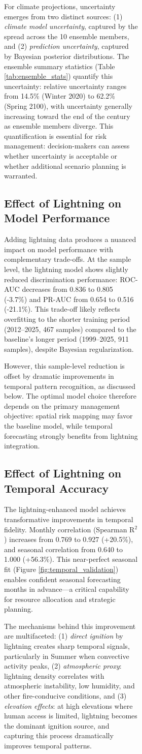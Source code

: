 \documentclass[11pt,a4paper]{article}
\begin{document}
\begin{figure}[H]
\begin{figure}[H]
\begin{figure}[H]
For climate projections, uncertainty emerges from two distinct sources: (1) \textit{climate model uncertainty}, captured by the spread across the 10 ensemble members, and (2) \textit{prediction uncertainty}, captured by Bayesian posterior distributions. The ensemble summary statistics (Table \ref{tab:ensemble_stats}) quantify this uncertainty: relative uncertainty ranges from 14.5\% (Winter 2020) to 62.2\% (Spring 2100), with uncertainty generally increasing toward the end of the century as ensemble members diverge. This quantification is essential for risk management: decision-makers can assess whether uncertainty is acceptable or whether additional scenario planning is warranted.

\subsection{Effect of Lightning on Model Performance}

Adding lightning data produces a nuanced impact on model performance with complementary trade-offs. At the sample level, the lightning model shows slightly reduced discrimination performance: ROC-AUC decreases from 0.836 to 0.805 (-3.7\%) and PR-AUC from 0.654 to 0.516 (-21.1\%). This trade-off likely reflects overfitting to the shorter training period (2012--2025, 467 samples) compared to the baseline's longer period (1999--2025, 911 samples), despite Bayesian regularization.

However, this sample-level reduction is offset by dramatic improvements in temporal pattern recognition, as discussed below. The optimal model choice therefore depends on the primary management objective: spatial risk mapping may favor the baseline model, while temporal forecasting strongly benefits from lightning integration.

\subsection{Effect of Lightning on Temporal Accuracy}

The lightning-enhanced model achieves transformative improvements in temporal fidelity. Monthly correlation (Spearman R$^2$) increases from 0.769 to 0.927 (+20.5\%), and seasonal correlation from 0.640 to 1.000 (+56.3\%). This near-perfect seasonal fit (Figure \ref{fig:temporal_validation}) enables confident seasonal forecasting months in advance---a critical capability for resource allocation and strategic planning.

The mechanisms behind this improvement are multifaceted: (1) \textit{direct ignition} by lightning creates sharp temporal signals, particularly in Summer when convective activity peaks, (2) \textit{atmospheric proxy}: lightning density correlates with atmospheric instability, low humidity, and other fire-conducive conditions, and (3) \textit{elevation effects}: at high elevations where human access is limited, lightning becomes the dominant ignition source, and capturing this process dramatically improves temporal patterns.


\end{figure}
\end{figure}
\end{figure}
\end{document}
